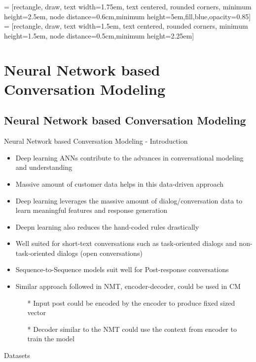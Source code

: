  = [rectangle, draw, text width=1.75em, text centered, rounded corners, minimum height=2.5em, node distance=0.6cm,minimum height=5em,fill,blue,opacity=0.85]
 = [rectangle, draw, text width=1.5em, text centered, rounded corners, minimum height=1.5em, node distance=0.5cm,minimum height=2.25em]
\DeclareDocumentCommand{}

\section{Neural Network based Conversation Modeling}
\subsection{Neural Network based Conversation Modeling}
\begin{frame}{Neural Network based Conversation Modeling - Introduction}

\begin{itemize}
	\item Deep learning ANNs contribute to the advances in conversational modeling and understanding
	\item Massive amount of customer data helps in this data-driven approach
	\item Deep learning leverages the massive amount of dialog/conversation data to learn meaningful features and response generation
	\item Deepn learning also reduces the hand-coded rules drastically
	\item Well suited for short-text conversations such as task-oriented dialogs and non-task-oriented dialogs (open conversations)
	\item Sequence-to-Sequence models suit well for Post-response conversations
	\item Similar approach followed in NMT, encoder-decoder, could be used in CM
	\begin{itemize}
		\item [*] Input post could be encoded by the encoder to produce fixed sized vector
		\item [*] Decoder similar to the NMT could use the context from encoder to train the model
	\end{itemize}
\end{itemize}

\end{frame}
\begin{frame}{Datasets}

\end{frame}

